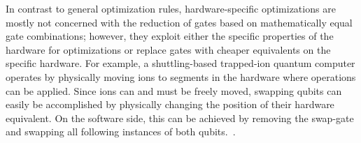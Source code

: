 In contrast to general optimization rules, hardware-specific optimizations are mostly not concerned with the reduction of gates based on mathematically equal gate combinations; however, they exploit either the specific properties of the hardware for optimizations or replace gates with cheaper equivalents on the specific hardware. For example, a shuttling-based trapped-ion quantum computer operates by physically moving ions to segments in the hardware where operations can be applied. Since ions can and must be freely moved, swapping qubits can easily be accomplished by physically changing the position of their hardware equivalent. On the software side, this can be achieved by removing the swap-gate and swapping all following instances of both qubits.~\cite{KMO*23}.